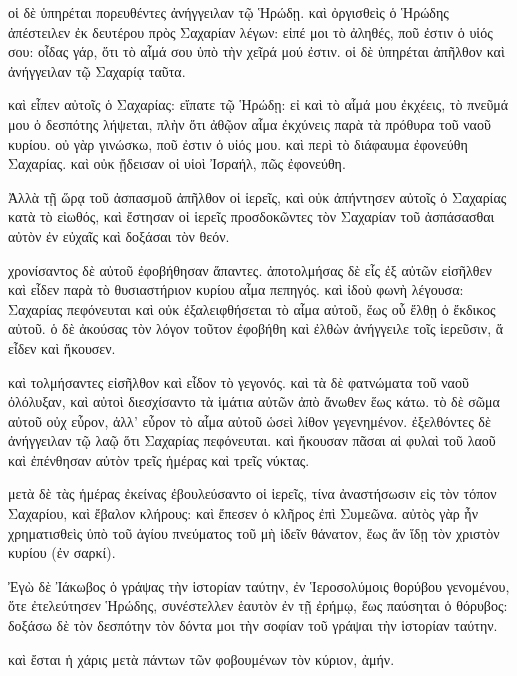 \pend\pstart
οἱ δὲ ὑπηρέται πορευθέντες ἀνήγγειλαν τῷ Ἡρώδῃ. καὶ ὀργισθεὶς ὁ Ἡρώδης ἀπέστειλεν ἐκ δευτέρου πρὸς Σαχαρίαν λέγων: εἰπέ μοι τὸ ἀληθές, ποῦ ἐστιν ὁ υἱός σου: οἶδας γάρ, ὅτι τὸ αἷμά σου ὑπὸ τὴν χεῖρά μού ἐστιν. οἱ δὲ ὑπηρέται ἀπῆλθον καὶ ἀνήγγειλαν τῷ Σαχαρίᾳ ταῦτα.

\pend\pstart
καὶ εἶπεν αὐτοῖς ὁ Σαχαρίας: εἴπατε τῷ Ἡρώδῃ: εἰ καὶ τὸ αἷμά μου ἐκχέεις, τὸ πνεῦμά μου ὁ δεσπότης λήψεται, πλὴν ὅτι ἀθῷον αἷμα ἐκχύνεις παρὰ τὰ πρόθυρα τοῦ ναοῦ κυρίου. οὐ γὰρ γινώσκω, ποῦ ἐστιν ὁ υἱός μου. καὶ περὶ τὸ διάφαυμα ἐφονεύθη Σαχαρίας. καὶ οὐκ ᾔδεισαν οἱ υἱοὶ Ἰσραήλ, πῶς ἐφονεύθη.

\pend\pstart
{}

\pend\setcounter{pstartL}{1}\pstart
Ἀλλὰ τῇ ὥρᾳ τοῦ ἀσπασμοῦ ἀπῆλθον οἱ ἱερεῖς, καὶ οὐκ ἀπήντησεν αὐτοῖς ὁ Σαχαρίας κατὰ τὸ εἰωθός, καὶ ἔστησαν οἱ ἱερεῖς προσδοκῶντες τὸν Σαχαρίαν τοῦ ἀσπάσασθαι αὐτὸν ἐν εὐχαῖς καὶ δοξάσαι τὸν θεόν.

\pend\pstart
χρονίσαντος δὲ αὐτοῦ ἐφοβήθησαν ἅπαντες. ἀποτολμήσας δὲ εἷς ἐξ αὐτῶν εἰσῆλθεν καὶ εἶδεν παρὰ τὸ θυσιαστήριον κυρίου αἷμα πεπηγός. καὶ ἰδοὺ φωνὴ λέγουσα: Σαχαρίας πεφόνευται καὶ οὐκ ἐξαλειφθήσεται τὸ αἷμα αὐτοῦ, ἕως οὗ ἔλθῃ ὁ ἔκδικος αὐτοῦ. ὁ δὲ ἀκούσας τὸν λόγον τοῦτον ἐφοβήθη καὶ ἐλθὼν ἀνήγγειλε τοῖς ἱερεῦσιν, ἅ εἶδεν καὶ ἤκουσεν.

\pend\pstart
καὶ τολμήσαντες εἰσῆλθον καὶ εἶδον τὸ γεγονός. καὶ τὰ δὲ φατνώματα τοῦ ναοῦ ὀλόλυξαν, καὶ αὐτοὶ διεσχίσαντο τὰ ἱμάτια αὐτῶν ἀπὸ ἄνωθεν ἕως κάτω. τὸ δὲ σῶμα αὐτοῦ οὐχ εὗρον, ἀλλ' εὗρον τὸ αἷμα αὐτοῦ ὡσεὶ λίθον γεγενημένον. ἐξελθόντες δὲ ἀνήγγειλαν τῷ λαῷ ὅτι Σαχαρίας πεφόνευται. καὶ ἤκουσαν πᾶσαι αἱ φυλαὶ τοῦ λαοῦ καὶ ἐπένθησαν αὐτὸν τρεῖς ἡμέρας καὶ τρεῖς νύκτας.

\pend\pstart
μετὰ δὲ τὰς ἡμέρας ἐκείνας ἐβουλεύσαντο οἱ ἱερεῖς, τίνα ἀναστήσωσιν εἰς τὸν τόπον Σαχαρίου, καὶ ἔβαλον κλήρους: καὶ ἔπεσεν ὁ κλῆρος ἐπὶ Συμεῶνα. αὐτὸς γὰρ ἦν χρηματισθεὶς ὑπὸ τοῦ ἁγίου πνεύματος τοῦ μὴ ἰδεῖν θάνατον, ἕως ἄν ἴδῃ τὸν χριστὸν κυρίου (ἐν σαρκί).

\pend\pstart
{}

\pend\setcounter{pstartL}{1}\pstart
Ἐγὼ δὲ Ἰάκωβος ὁ γράψας τὴν ἱστορίαν ταύτην, ἐν Ἱεροσολύμοις θορύβου γενομένου, ὅτε ἐτελεύτησεν Ἡρώδης, συνέστελλεν ἑαυτὸν ἐν τῇ ἐρήμῳ, ἕως παύσηται ὁ θόρυβος: δοξάσω δὲ τὸν δεσπότην τὸν δόντα μοι τὴν σοφίαν τοῦ γράψαι τὴν ἱστορίαν ταύτην.

\pend\pstart
καὶ ἔσται ἡ χάρις μετὰ πάντων τῶν φοβουμένων τὸν κύριον, ἀμήν.

\pend
